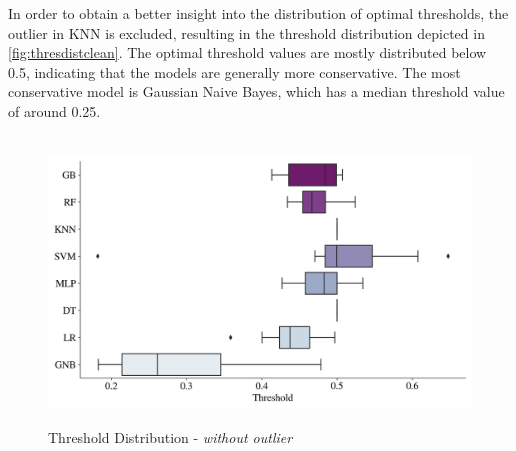 \newpage
In order to obtain a better insight into the distribution of optimal thresholds, the outlier in KNN is excluded, resulting in the threshold distribution depicted in \autoref{fig:thresdistclean}. The optimal threshold values are mostly distributed below 0.5, indicating that the models are generally more conservative. The most conservative model is Gaussian Naive Bayes, which has a median threshold value of around 0.25.
\begin{figure}[H]
\centering
\caption{Threshold Distribution - \textit{without outlier}}\vspace{0.5em}
\label{fig:thresdistclean}\
\includegraphics[width=140mm]{Figures/Threshold_wo_outliers_Distribution.jpg}

\vspace{-1em}
\end{figure}

